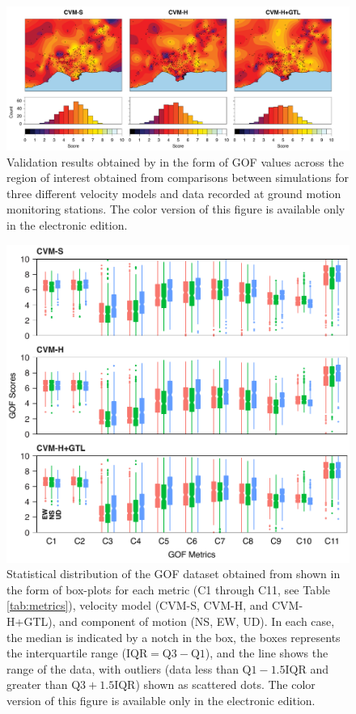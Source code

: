 \begin{figure}[t]
    \centering
    \includegraphics[width=\textwidth]{figures/pdf/figure-02}
    \caption{Validation results obtained by \citet{Taborda_2014_BSSA} in the form of GOF values across the region of interest obtained from comparisons between simulations for three different velocity models and data recorded at ground motion monitoring stations. The color version of this figure is available only in the electronic edition.}
    \label{fig:ref-gof-maps}
\end{figure}
% 
\begin{figure}[ht!]
    \centering
    \includegraphics[width=\columnwidth]{figures/pdf/figure-03}
    \caption{Statistical distribution of the GOF dataset obtained from \citet{Taborda_2014_BSSA} shown in the form of box-plots for each metric (C1 through C11, see Table \ref{tab:metrics}), velocity model (CVM-S, CVM-H, and CVM-H+GTL), and component of motion (NS, EW, UD). In each case, the median is indicated by a notch in the box, the boxes represents the interquartile range ($\mathrm{IQR} = \mathrm{Q}3 - \mathrm{Q}1$), and the line shows the range of the data, with outliers (data less than $\mathrm{Q}1 - 1.5 \mathrm{IQR}$ and greater than $\mathrm{Q}3 + 1.5 \mathrm{IQR}$) shown as scattered dots. The color version of this figure is available only in the electronic edition.}
    \label{fig:data-box-plot}
\end{figure}

